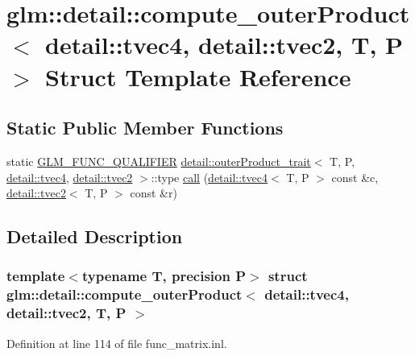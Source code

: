 \hypertarget{structglm_1_1detail_1_1compute__outer_product_3_01detail_1_1tvec4_00_01detail_1_1tvec2_00_01_t_00_01_p_01_4}{}\section{glm\+:\+:detail\+:\+:compute\+\_\+outer\+Product$<$ detail\+:\+:tvec4, detail\+:\+:tvec2, T, P $>$ Struct Template Reference}
\label{structglm_1_1detail_1_1compute__outer_product_3_01detail_1_1tvec4_00_01detail_1_1tvec2_00_01_t_00_01_p_01_4}
\subsection*{Static Public Member Functions}
\begin{DoxyCompactItemize}
\item 
static \hyperlink{setup_8hpp_a33fdea6f91c5f834105f7415e2a64407}{G\+L\+M\+\_\+\+F\+U\+N\+C\+\_\+\+Q\+U\+A\+L\+I\+F\+I\+ER} \hyperlink{structglm_1_1detail_1_1outer_product__trait}{detail\+::outer\+Product\+\_\+trait}$<$ T, P, \hyperlink{structglm_1_1detail_1_1tvec4}{detail\+::tvec4}, \hyperlink{structglm_1_1detail_1_1tvec2}{detail\+::tvec2} $>$\+::type \hyperlink{structglm_1_1detail_1_1compute__outer_product_3_01detail_1_1tvec4_00_01detail_1_1tvec2_00_01_t_00_01_p_01_4_a7ae9fc8b98d19655b6cb21fc1ff997b2}{call} (\hyperlink{structglm_1_1detail_1_1tvec4}{detail\+::tvec4}$<$ T, P $>$ const \&c, \hyperlink{structglm_1_1detail_1_1tvec2}{detail\+::tvec2}$<$ T, P $>$ const \&r)
\end{DoxyCompactItemize}


\subsection{Detailed Description}
\subsubsection*{template$<$typename T, precision P$>$\newline
struct glm\+::detail\+::compute\+\_\+outer\+Product$<$ detail\+::tvec4, detail\+::tvec2, T, P $>$}



Definition at line 114 of file func\+\_\+matrix.\+inl.



